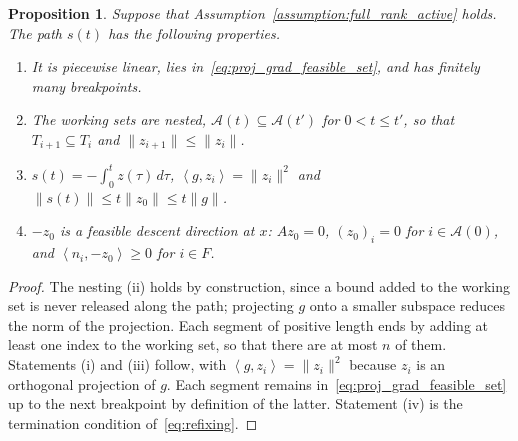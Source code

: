 \documentclass{article}
\numberwithin{equation}{section}
\newcommand{\calA}{{\mathcal{A}}}
\newcommand{\inner}[2]{\left\langle {#1} , {#2} \right\rangle} %
\theoremstyle{plain}
\newtheorem{proposition}[theorem]{Proposition}
\begin{document}
\begin{proposition}\label{prop:computed_path}
	Suppose that Assumption~\ref{assumption:full_rank_active} holds. The path $s(t)$ has the following properties.
	\begin{enumerate}[label=(\roman*), leftmargin=*, itemsep=2pt]
		\item It is piecewise linear, lies in~\eqref{eq:proj_grad_feasible_set}, and has finitely many breakpoints.
		\item The working sets are nested, $\calA(t) \subseteq \calA(t')$ for $0 < t \le t'$, so that $T_{i+1} \subseteq T_i$ and $\|z_{i+1}\| \le \|z_i\|$.
		\item $s(t) = -\int_0^t z(\tau)\,d\tau$, $\inner{g}{z_i} = \|z_i\|^2$ and $\|s(t)\| \le t\|z_0\| \le t\|g\|$.
		\item $-z_0$ is a feasible descent direction at $x$: $Az_0 = 0$, $(z_0)_i = 0$ for $i \in \calA(0)$, and $\inner{n_i}{-z_0} \ge 0$ for $i \in F$.
	\end{enumerate}
\end{proposition}
\begin{proof}
	The nesting (ii) holds by construction, since a bound added to the working set is never released along the path; projecting $g$ onto a smaller subspace reduces the norm of the projection. Each segment of positive length ends by adding at least one index to the working set, so that there are at most $n$ of them. Statements (i) and (iii) follow, with $\inner{g}{z_i} = \|z_i\|^2$ because $z_i$ is an orthogonal projection of $g$. Each segment remains in~\eqref{eq:proj_grad_feasible_set} up to the next breakpoint by definition of the latter. Statement (iv) is the termination condition of~\eqref{eq:refixing}.
\end{proof}
\end{document}
